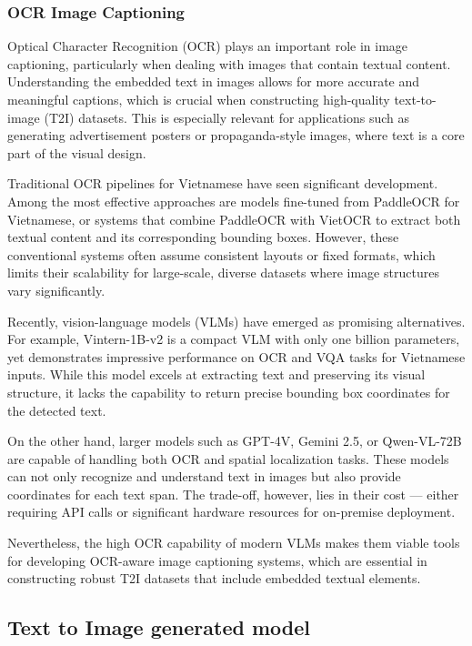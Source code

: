 \documentclass[conference]{IEEEtran}
\begin{document}
\subsubsection{OCR Image Captioning}
Optical Character Recognition (OCR) plays an important role in image captioning, particularly when dealing with images that contain textual content. Understanding the embedded text in images allows for more accurate and meaningful captions, which is crucial when constructing high-quality text-to-image (T2I) datasets. This is especially relevant for applications such as generating advertisement posters or propaganda-style images, where text is a core part of the visual design.

Traditional OCR pipelines for Vietnamese have seen significant development. Among the most effective approaches are models fine-tuned from PaddleOCR
\cite{paddleocr2021} for Vietnamese, or systems that combine PaddleOCR with VietOCR \cite{vietocr2020} to extract both textual content and its corresponding bounding boxes. However, these conventional systems often assume consistent layouts or fixed formats, which limits their scalability for large-scale, diverse datasets where image structures vary significantly.

Recently, vision-language models (VLMs) have emerged as promising alternatives. For example, Vintern-1B-v2 \cite{doan2024vintern1befficientmultimodallarge} is a compact VLM with only one billion parameters, yet demonstrates impressive performance on OCR and VQA tasks for Vietnamese inputs. While this model excels at extracting text and preserving its visual structure, it lacks the capability to return precise bounding box coordinates for the detected text.

On the other hand, larger models such as GPT-4V, Gemini 2.5, or Qwen-VL-72B are capable of handling both OCR and spatial localization tasks. These models can not only recognize and understand text in images but also provide coordinates for each text span. The trade-off, however, lies in their cost — either requiring API calls or significant hardware resources for on-premise deployment.

Nevertheless, the high OCR capability of modern VLMs makes them viable tools for developing OCR-aware image captioning systems, which are essential in constructing robust T2I datasets that include embedded textual elements.

\subsection{Text to Image generated model}
\end{document}

